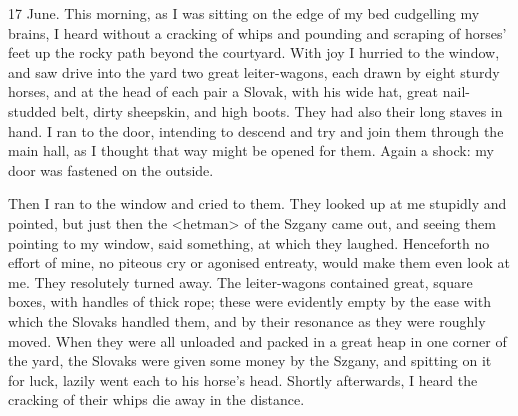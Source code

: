 \begin{diary}{17 June.}
This morning, as I was sitting on the edge of my bed cudgelling my brains, I heard without a cracking of whips and pounding and scraping of horses' feet up the rocky path beyond the courtyard. With joy I hurried to the window, and saw drive into the yard two great leiter-wagons, each drawn by eight sturdy horses, and at the head of each pair a Slovak, with his wide hat, great nail-studded belt, dirty sheepskin, and high boots. They had also their long staves in hand. I ran to the door, intending to descend and try and join them through the main hall, as I thought that way might be opened for them. Again a shock: my door was fastened on the outside.

Then I ran to the window and cried to them. They looked up at me stupidly and pointed, but just then the <hetman> of the Szgany came out, and seeing them pointing to my window, said something, at which they laughed. Henceforth no effort of mine, no piteous cry or agonised entreaty, would make them even look at me. They resolutely turned away. The leiter-wagons contained great, square boxes, with handles of thick rope; these were evidently empty by the ease with which the Slovaks handled them, and by their resonance as they were roughly moved. When they were all unloaded and packed in a great heap in one corner of the yard, the Slovaks were given some money by the Szgany, and spitting on it for luck, lazily went each to his horse's head. Shortly afterwards, I heard the cracking of their whips die away in the distance.
\end{diary}
 
